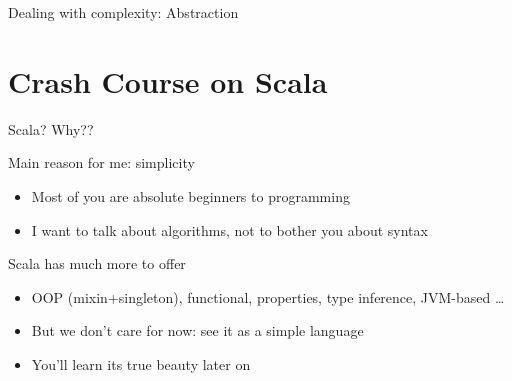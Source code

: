 \begin{frame}{Dealing with complexity: Abstraction}
\end{frame}
\section{Crash Course on Scala}\sectionpage
\begin{frame}{Scala? Why??}

  \begin{block}{Main reason for me: simplicity}
    \begin{itemize}
    \item Most of you are absolute beginners to programming
    \item I want to talk about algorithms, not to bother you about syntax
    \end{itemize}
  \end{block}

  \begin{block}{Scala has much more to offer}
    \begin{itemize}
    \item OOP (mixin+singleton), functional, properties, type inference, JVM-based \ldots
    \item<2-> But we don't care for now: \alert{see it as a simple language}
    \item<2-> You'll learn its true beauty later on
    \end{itemize}
  \end{block}
\end{frame}
